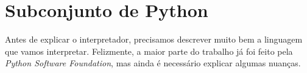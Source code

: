 \chapter{Subconjunto de Python}

Antes de explicar o interpretador, precisamos descrever
muito bem a linguagem que vamos interpretar. Felizmente,
a maior parte do trabalho já foi feito pela \textit{Python
Software Foundation}, mas ainda é necessário explicar algumas
nuanças.



